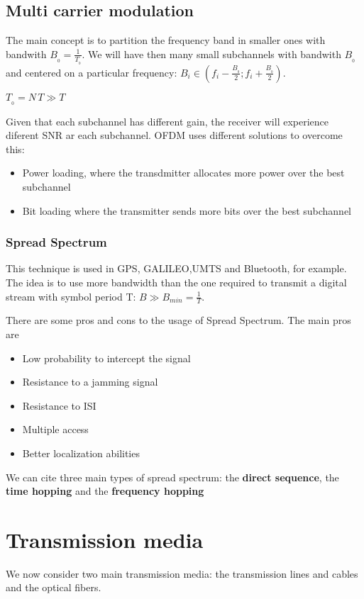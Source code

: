 \subsection{Multi carrier modulation}
The main concept is to partition the frequency band in smaller ones with bandwith $B_{_0}=\frac{1}{T_{_0}}$. We will have then many small subchannels with bandwith $B_{_0}$ and centered on a particular frequency: $B_i \in \left(f_i - \frac{B_{_0}}{2};f_i + \frac{B_{_0}}{2}\right)$.

%   


$T_{_0}=N\,T \gg T$

Given that each subchannel has different gain, the receiver will experience diferent SNR ar each subchannel. OFDM uses different solutions to overcome this:
\begin{itemize}
  \item Power loading, where the transdmitter allocates more power over the best subchannel
  \item Bit loading where the transmitter sends more bits over the best subchannel
\end{itemize}

\subsubsection{Spread Spectrum}
This technique is used in GPS, GALILEO,UMTS and Bluetooth, for example. The idea is to use more bandwidth than the one required to transmit a digital stream with symbol period T: $B \gg B_{min}=\frac{1}{T}$.

There are some pros and cons to the usage of Spread Spectrum. The main pros are
\begin{itemize}
  \item Low probability to intercept the signal
  \item Resistance to a jamming signal
  \item Resistance to ISI
  \item Multiple access
  \item Better localization abilities
\end{itemize}
We can cite three main types of spread spectrum: the \textbf{direct sequence}, the \textbf{time hopping} and the \textbf{frequency hopping}

\section{Transmission media}
We now consider two main transmission media: the transmission lines and cables and the optical fibers.

